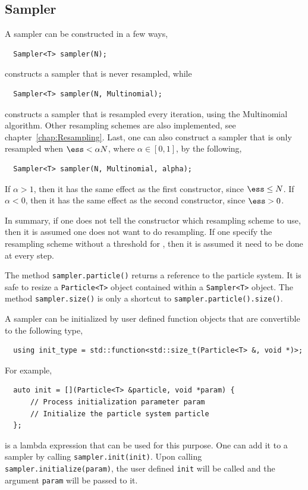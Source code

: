 \subsection{Sampler}
\label{sub:Sampler}

A sampler can be constructed in a few ways,
\begin{Verbatim}
  Sampler<T> sampler(N);
\end{Verbatim}
constructs a sampler that is never resampled, while
\begin{Verbatim}
  Sampler<T> sampler(N, Multinomial);
\end{Verbatim}
constructs a sampler that is resampled every iteration, using the Multinomial
algorithm. Other resampling schemes are also implemented, see
chapter~\ref{chap:Resampling}. Last, one can also construct a sampler that is
only resampled when $\ess < \alpha N$, where $\alpha\in[0, 1]$, by the
following,
\begin{Verbatim}
  Sampler<T> sampler(N, Multinomial, alpha);
\end{Verbatim}
If $\alpha > 1$, then it has the same effect as the first constructor, since
$\ess \le N$. If $\alpha < 0$, then it has the same effect as the second
constructor, since $\ess > 0$.

In summary, if one does not tell the constructor which resampling scheme to
use, then it is assumed one does not want to do resampling. If one specify the
resampling scheme without a threshold for \ess, then it is assumed it need to
be done at every step.

The method \verb|sampler.particle()| returns a reference to the particle
system. It is safe to resize a \verb|Particle<T>| object contained within a
\verb|Sampler<T>| object. The method \verb|sampler.size()| is only a shortcut
to \verb|sampler.particle().size()|.

A sampler can be initialized by user defined function objects that are
convertible to the following type,
\begin{Verbatim}
  using init_type = std::function<std::size_t(Particle<T> &, void *)>;
\end{Verbatim}
For example,
\begin{Verbatim}
  auto init = [](Particle<T> &particle, void *param) {
      // Process initialization parameter param
      // Initialize the particle system particle
  };
\end{Verbatim}
is a \cppoo lambda expression that can be used for this purpose. One can add it
to a sampler by calling \verb|sampler.init(init)|. Upon calling
\verb|sampler.initialize(param)|, the user defined \verb|init| will be called
and the argument \verb|param| will be passed to it.

